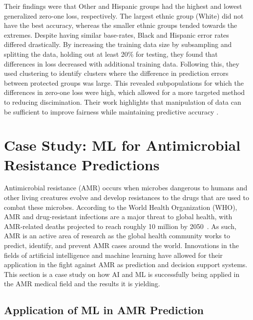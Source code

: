 \documentclass[a4paper]{article}
\begin{document}
Their findings were that Other and Hispanic groups had the highest and lowest generalized zero-one loss, respectively. The largest ethnic group (White) did not have the best accuracy, whereas the smaller ethnic groups tended towards the extremes. Despite having similar base-rates, Black and Hispanic error rates differed drastically. By increasing the training data size by subsampling and splitting the data, holding out at least 20\% for testing, they found that differences in loss decreased with additional training data. Following this, they used clustering to identify clusters where the difference in prediction errors between protected groups was large. This revealed subpopulations for which the differences in zero-one loss were high, which allowed for a more targeted method to reducing discimination. Their work highlights that manipulation of data can be sufficient to improve fairness while maintaining predictive accuracy \cite{Chen_2018}.

\section{Case Study: ML for Antimicrobial Resistance Predictions}

Antimicrobial resistance (AMR) occurs when microbes dangerous to humans and other living creatures evolve and develop resistances to the drugs that are used to combat these microbes. According to the World Health Organization (WHO), AMR and drug-resistant infections are a major threat to global health, with AMR-related deaths projected to reach roughly 10 million by 2050~\cite{balkhy_amr_2021}. As such, AMR is an active area of research as the global health community works to predict, identify, and prevent AMR cases around the world. Innovations in the fields of artificial intelligence and machine learning have allowed for their application in the fight against AMR as prediction and decision support systems. This section is a case study on how AI and ML is successfully being applied in the AMR medical field and the results it is yielding.

\subsection{Application of ML in AMR Prediction}
\end{document}
